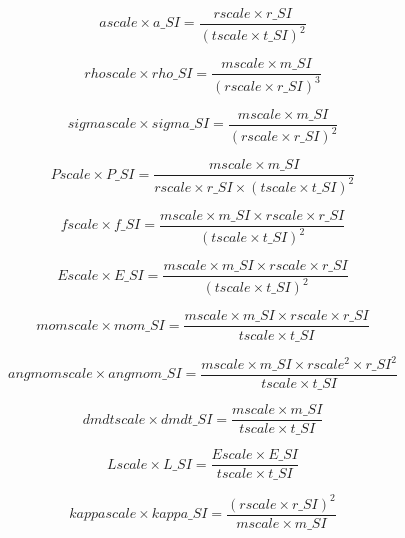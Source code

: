 \documentclass[a4paper]{article}
\begin{document}
\begin{equation}
ascale \times a\_SI = \frac{rscale \times r\_SI} {\left(tscale \times t\_SI \right)^2}
\end{equation}

\begin{equation}
rhoscale \times rho\_SI = \frac{mscale \times m\_SI} {\left(rscale \times r\_SI \right)^3}
\end{equation}

\begin{equation}
sigmascale \times sigma\_SI = \frac{mscale \times m\_SI} {\left(rscale \times r\_SI \right)^2}
\end{equation}

\begin{equation}
Pscale \times P\_SI = \frac{mscale \times m\_SI} {rscale \times r\_SI \times \left( tscale \times t\_SI \right)^2}
\end{equation}

\begin{equation}
fscale \times f\_SI = \frac{mscale \times m\_SI \times rscale \times r\_SI} {\left( tscale \times t\_SI \right)^2}
\end{equation}

\begin{equation}
Escale \times E\_SI = \frac{mscale \times m\_SI \times  rscale \times r\_SI} {\left( tscale \times t\_SI \right)^2}
\end{equation}

\begin{equation}
momscale \times mom\_SI = \frac{mscale \times m\_SI \times rscale \times r\_SI} {tscale \times t\_SI}
\end{equation}

\begin{equation}
angmomscale \times angmom\_SI = \frac{mscale \times m\_SI \times rscale^2 \times r\_SI^2}{tscale \times t\_SI}
\end{equation}
 
\begin{equation}
dmdtscale \times dmdt\_SI = \frac{mscale \times m\_SI}{tscale \times t\_SI}
\end{equation}

\begin{equation}
Lscale \times L\_SI = \frac{Escale \times E\_SI}{tscale \times t\_SI}
\end{equation}

\begin{equation}
kappascale \times kappa\_SI = \frac{\left(rscale \times r\_SI \right)^2}{mscale \times m\_SI}
\end{equation}
\end{document}
